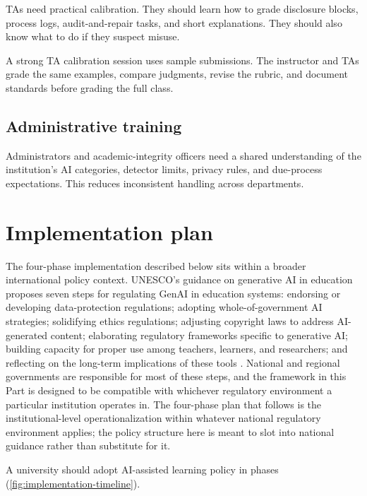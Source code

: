 \documentclass{SIAMbook2023}
\begin{document}
TAs need practical calibration. They should learn how to grade disclosure blocks, process logs, audit-and-repair tasks, and short explanations. They should also know what to do if they suspect misuse.

A strong TA calibration session uses sample submissions. The instructor and TAs grade the same examples, compare judgments, revise the rubric, and document standards before grading the full class.

\subsection{Administrative training}
\label{u:subsec:admin-training}

Administrators and academic-integrity officers need a shared understanding of the institution's AI categories, detector limits, privacy rules, and due-process expectations. This reduces inconsistent handling across departments.

\section{Implementation plan}
\label{u:sec:implementation}%

The four-phase implementation described below sits within a broader international policy context. UNESCO's guidance on generative AI in education proposes seven steps for regulating GenAI in education systems: endorsing or developing data-protection regulations; adopting whole-of-government AI strategies; solidifying ethics regulations; adjusting copyright laws to address AI-generated content; elaborating regulatory frameworks specific to generative AI; building capacity for proper use among teachers, learners, and researchers; and reflecting on the long-term implications of these tools \citep{miao2023guidance}. National and regional governments are responsible for most of these steps, and the framework in this Part is designed to be compatible with whichever regulatory environment a particular institution operates in. The four-phase plan that follows is the institutional-level operationalization within whatever national regulatory environment applies; the policy structure here is meant to slot into national guidance rather than substitute for it.

A university should adopt AI-assisted learning policy in phases (\cref{fig:implementation-timeline}).
\end{document}
